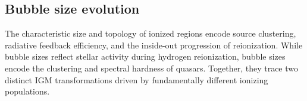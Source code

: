 \documentclass[apj,twocolumn, appendixfloats, twocolappendix, numberedappendix, tighten]{openjournal}
\begin{document}

\subsection{Bubble size evolution} \label{sec:bubble}

The characteristic size and topology of ionized regions encode source clustering, radiative feedback efficiency, and the inside-out progression of reionization. While  bubble sizes reflect stellar activity during hydrogen reionization,  bubble sizes encode the clustering and spectral hardness of quasars. Together, they trace two distinct IGM transformations driven by fundamentally different ionizing populations.



\end{document}
